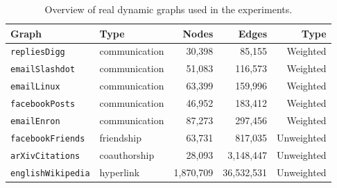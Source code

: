 \documentclass[english]{llncs}
\begin{document}
\begin{table*}[t]
\begin{center}
\begin{scriptsize}
  \begin{tabular}{ | l | l | r | r | r |}
    \hline
    Graph 						& Type 				& Nodes 			& Edges 			&  Type\\ \hline
   
    \texttt{repliesDigg}				& communication	& 30,398			& 85,155 			& Weighted	\\
    \texttt{emailSlashdot}			& communication	& 51,083 			& 116,573			& Weighted	\\ 
    \texttt{emailLinux}				& communication	& 63,399 			& 159,996			& Weighted	\\
    \texttt{facebookPosts}		& communication	& 46,952			& 183,412 		& Weighted	\\
    \texttt{emailEnron}				& communication	& 87,273 			& 297,456			& Weighted	\\
    \texttt{facebookFriends}			& friendship		& 63,731			& 817,035 		& Unweighted	\\
    \texttt{arXivCitations} 			& coauthorship 		& 28,093			& 3,148,447		& Unweighted	\\
    \texttt{englishWikipedia}		& hyperlink		& 1,870,709		& 36,532,531 		& Unweighted	\\

    \hline
  \end{tabular}
  \end{scriptsize}
\end{center}
  \caption{Overview of real dynamic graphs used in the experiments.}
  \label{table:graphs}
   \vspace{-4ex}
\end{table*}
\end{document}
